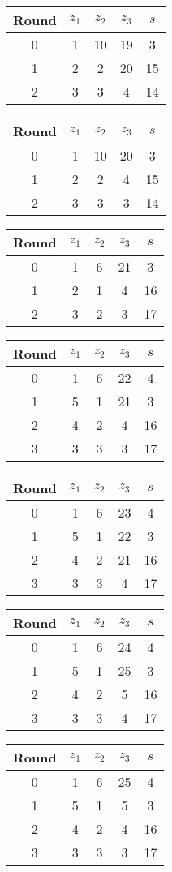 \begin{tabular}{c | c | c | c | c }
Round & $z_1$ & $z_2$ & $z_3$ & $s$ \\
\hline
0 & 1 & 10 & 19 & 3 \\
1 & 2 & 2 & 20 & 15 \\
2 & 3 & 3 & 4 & 14
\end{tabular}

\begin{tabular}{c | c | c | c | c }
Round & $z_1$ & $z_2$ & $z_3$ & $s$ \\
\hline
0 & 1 & 10 & 20 & 3 \\
1 & 2 & 2 & 4 & 15 \\
2 & 3 & 3 & 3 & 14
\end{tabular}

\begin{tabular}{c | c | c | c | c }
Round & $z_1$ & $z_2$ & $z_3$ & $s$ \\
\hline
0 & 1 & 6 & 21 & 3 \\
1 & 2 & 1 & 4 & 16 \\
2 & 3 & 2 & 3 & 17
\end{tabular}

\begin{tabular}{c | c | c | c | c }
Round & $z_1$ & $z_2$ & $z_3$ & $s$ \\
\hline
0 & 1 & 6 & 22 & 4 \\
1 & 5 & 1 & 21 & 3 \\
2 & 4 & 2 & 4 & 16 \\
3 & 3 & 3 & 3 & 17
\end{tabular}

\begin{tabular}{c | c | c | c | c }
Round & $z_1$ & $z_2$ & $z_3$ & $s$ \\
\hline
0 & 1 & 6 & 23 & 4 \\
1 & 5 & 1 & 22 & 3 \\
2 & 4 & 2 & 21 & 16 \\
3 & 3 & 3 & 4 & 17
\end{tabular}

\begin{tabular}{c | c | c | c | c }
Round & $z_1$ & $z_2$ & $z_3$ & $s$ \\
\hline
0 & 1 & 6 & 24 & 4 \\
1 & 5 & 1 & 25 & 3 \\
2 & 4 & 2 & 5 & 16 \\
3 & 3 & 3 & 4 & 17
\end{tabular}

\begin{tabular}{c | c | c | c | c }
Round & $z_1$ & $z_2$ & $z_3$ & $s$ \\
\hline
0 & 1 & 6 & 25 & 4 \\
1 & 5 & 1 & 5 & 3 \\
2 & 4 & 2 & 4 & 16 \\
3 & 3 & 3 & 3 & 17
\end{tabular}

